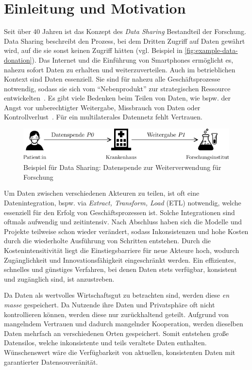 
\section{Einleitung und Motivation}

Seit über 40 Jahren ist das Konzept des \emph{Data Sharing} Bestandteil der Forschung.
Data Sharing beschreibt den Prozess, bei dem Dritten Zugriff auf Daten gewährt wird, auf die sie sonst keinen Zugriff hätten (vgl. Beispiel in \autoref{fig:example-data-donation}).
Das Internet und die Einführung von Smartphones ermöglicht es, nahezu sofort Daten zu erhalten und weiterzuverteilen.
Auch im betrieblichen Kontext sind Daten essenziell.
Sie sind für nahezu alle Geschäftsprozesse notwendig, sodass sie sich vom \enquote{Nebenprodukt} zur strategischen Ressource entwickelten~\cite{mollerIndustrialDataEcosystems2024}.
Es gibt viele Bedenken beim Teilen von Daten, wie bspw. der Angst vor unberechtigter Weitergabe, Missbrauch von Daten oder Kontrollverlust~\cite{mollerIndustrialDataEcosystems2024}.
Für ein multilaterales Datennetz fehlt Vertrauen.

\begin{figure}
    \includegraphics[width=\textwidth]{./assets/example_horizontal.drawio.pdf}
    \caption{Beispiel für Data Sharing: Datenspende zur Weiterverwendung für Forschung}
    \label{fig:example-data-donation}
\end{figure}

Um Daten zwischen verschiedenen Akteuren zu teilen, ist oft eine Datenintegration, bspw. via \emph{Extract, Transform, Load} (ETL) notwendig, welche essenziell für den Erfolg von Geschäftsprozessen ist.
Solche Integrationen sind oftmals aufwendig und zeitintensiv.
Nach Abschluss haben sich die Modelle und Projekte teilweise schon wieder verändert, sodass Inkonsistenzen und hohe Kosten durch die wiederholte Ausführung von Schritten entstehen.
Durch die Kostenintensitivität liegt die Einstiegsbarriere für neue Akteure hoch, wodurch Zugänglichkeit und Innovationsfähigkeit eingeschränkt werden.
Ein effizientes, schnelles und günstiges Verfahren, bei denen Daten stets verfügbar, konsistent und zugänglich sind, ist anzustreben.

Da Daten als wertvolles Wirtschaftsgut zu betrachten sind, werden diese \emph{en masse} gespeichert.
Da Nutzende ihre Daten und Privatsphäre oft nicht kontrollieren können, werden diese nur zurückhaltend geteilt.
Aufgrund von mangelndem Vertrauen und dadurch mangelnder Kooperation, werden dieselben Daten mehrfach an verschiedenen Orten gespeichert.
Somit entstehen große Datensilos, welche inkonsistente und teils veraltete Daten enthalten.
Wünschenswert wäre die Verfügbarkeit von aktuellen, konsistenten Daten mit garantierter Datensouveränität.

